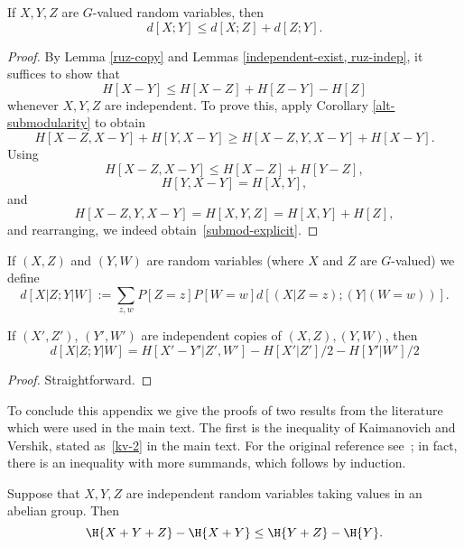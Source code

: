\begin{lemma}\label{ruzsa-triangle} If $X,Y,Z$ are $G$-valued random variables, then
$$ d[X;Y] \leq d[X;Z] + d[Z;Y].$$
\end{lemma}

\begin{proof} By Lemma \ref{ruz-copy} and Lemmas \ref{independent-exist, ruz-indep}, it suffices to show that
\begin{equation}\label{submod-explicit} H[X - Y] \leq H[X-Z] + H[Z-Y] - H[Z]\end{equation}
whenever $X, Y, Z$ are independent. To prove this, apply Corollary \ref{alt-submodularity} to obtain
\[ H[X - Z, X - Y] + H[Y, X - Y] \geq H[X - Z, Y, X - Y] + H[X - Y].\]
Using
\[ H[X - Z, X - Y] \leq H[X - Z] + H[Y - Z],\]
\[ H[Y, X - Y] = H[X, Y], \] and
\[ H[X - Z, Y, X - Y] = H[X, Y, Z] = H[X, Y] + H[Z],\] and rearranging, we indeed obtain~\eqref{submod-explicit}.
\end{proof}

\begin{definition}\label{cond-dist-def}
If $(X, Z)$ and $(Y, W)$ are random variables (where $X$ and $Z$ are $G$-valued) we define
$$ d[X  | Z; Y | W] := \sum_{z,w} P[Z=z] P[W=w] d[(X|Z=z); (Y|(W=w))].$$
\end{definition}

\begin{lemma}\label{cond-dist-alt}  If $(X',Z')$, $(Y',W')$ are independent copies of $(X,Z), (Y,W)$, then
$$  d[X  | Z;Y | W] = H[X'-Y'|Z',W'] - H[X'|Z']/2 - H[Y'|W']/2$$
\end{lemma}

\begin{proof} Straightforward.
\end{proof}




To conclude this appendix we give the proofs of two results from the literature which were used in the main text. The first is the inequality of Kaimanovich and Vershik, stated as~\eqref{kv-2} in the main text. For the original reference see~\cite[Proposition 1.3]{kv}; in fact, there is an inequality with more summands, which follows by induction.

\begin{lemma}
Suppose that $X, Y, Z$ are independent random variables taking values in an abelian group. Then
\[
  \H{X + Y + Z} - \H{X + Y} \leq \H{Y+Z} - \H{Y}.
\]
\end{lemma}

